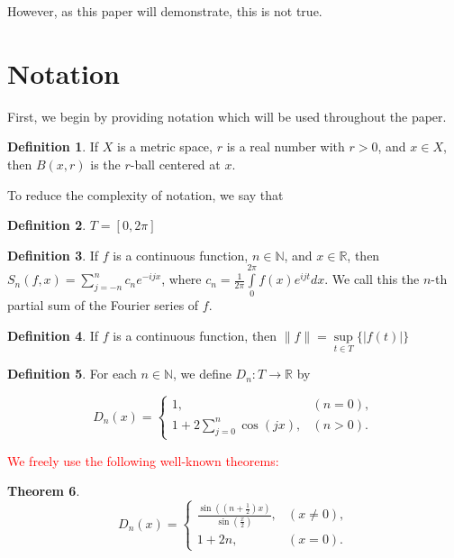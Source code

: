 \documentclass{amsart}
\newcommand{\N}{\mathbb{N}}
\newcommand{\R}{\mathbb{R}}
\newcommand{\colorcomment}[2]{\textcolor{#1}{#2}} %
\newcommand{\absval}[1]{\lvert #1 \rvert}
\newcommand{\norm}[1]{\|#1\|}
\newtheorem{thm}{Theorem}[section]
\theoremstyle{definition}
\newtheorem{definition}[thm]{Definition}
\begin{document}
However, as this paper will demonstrate, this is not true. 

\section{Notation}

First, we begin by providing notation which will be used throughout the paper.

\begin{definition}
If $X$ is a metric space, $r$ is a real number with $r>0$, and $x \in X$, then $B(x,r)$ is the $r$-ball centered at $x$.
\end{definition}

To reduce the complexity of notation, we say that

\begin{definition}
$T = [0, 2 \pi]$
\end{definition}

\begin{definition}
If $f$ is a continuous function, $n \in \N$, and $x \in \R$, then $S_n(f,x) = \sum\limits_{j=-n}^n c_n e^{-ijx}$, where $c_n = \frac{1}{2 \pi} \int\limits_0^{2\pi} f(x)e^{ijt} dx$. We call this the $n$-th partial sum of the Fourier series of $f$.
\end{definition}

\begin{definition}
If $f$ is a continuous function, then $\norm{f} = \sup\limits_{t \in T} \{\absval{f(t)}\}$
\end{definition}

\begin{definition}
For each $n \in \N$, we define $D_n: T \to \R$ by


\begin{displaymath}
   D_n(x) = \left\{
     \begin{array}{lr}
       1, &(n=0),\\
       1+ 2\sum\limits_{j=0}^n \cos(j x), &(n > 0).
     \end{array}
   \right.
\end{displaymath} 
\end{definition}

\colorcomment{red}{We freely use the following well-known theorems:}

\begin{thm}
\begin{displaymath}
   D_n(x) = \left\{
     \begin{array}{lr}
       \frac{\sin((n+\frac{1}{2})x)}{\sin(\frac{x}{2})}, &(x \neq 0),\\
       1+2n, &(x=0).
     \end{array}
   \right.
\end{displaymath}
\end{thm}
\end{document}
